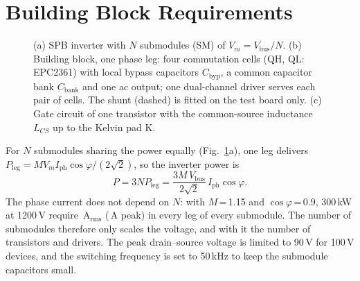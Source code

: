 \documentclass[conference]{IEEEtran}
\begin{document}
\section{Building Block Requirements}
\begin{figure}[t]
\centering
\resizebox{\textwidth}{!}{}
\caption{(a) SPB inverter with $N$ submodules (SM) of $V_m=V_\mathrm{bus}/N$. (b) Building block, one phase leg: four commutation cells (QH, QL: EPC2361) with local bypass capacitors $C_\mathrm{byp}$, a common capacitor bank $C_\mathrm{bank}$ and one ac output; one dual-channel driver serves each pair of cells. The shunt (dashed) is fitted on the test board only. (c) Gate circuit of one transistor with the common-source inductance $L_{CS}$ up to the Kelvin pad K.}
\label{fig:spb}
\end{figure}

For $N$ submodules sharing the power equally (Fig.~\ref{fig:spb}a), one leg delivers $P_\mathrm{leg}=M V_m I_\mathrm{ph}\cos\varphi/(2\sqrt2)$, so the inverter power is
\begin{equation}
P=3N P_\mathrm{leg}=\frac{3M\,V_\mathrm{bus}}{2\sqrt2}\,I_\mathrm{ph}\cos\varphi .
\label{eq:p}
\end{equation}
The phase current does not depend on $N$: with $M$\,=\,1.15 and $\cos\varphi$\,=\,0.9, 300\,kW at 1200\,V require \Irms\,A$_\mathrm{rms}$ (\Ipk\,A peak) in every leg of every submodule. The number of submodules therefore only scales the voltage, and with it the number of transistors and drivers. The peak drain--source voltage is limited to 90\,V for 100\,V devices, and the switching frequency is set to 50\,kHz to keep the submodule capacitors small.

\end{document}
